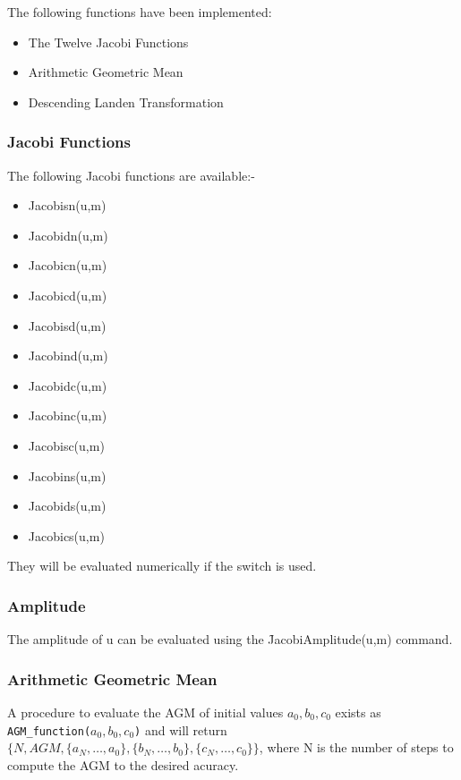 The following functions have been implemented:

\begin{itemize}
\item The Twelve Jacobi Functions
\item Arithmetic Geometric Mean
\item Descending Landen Transformation
\end{itemize}

\subsubsection{Jacobi Functions}

The following Jacobi functions are available:-

\begin{itemize}
\item Jacobisn(u,m)
\item Jacobidn(u,m)
\item Jacobicn(u,m)
\item Jacobicd(u,m)
\item Jacobisd(u,m)
\item Jacobind(u,m)
\item Jacobidc(u,m)
\item Jacobinc(u,m)
\item Jacobisc(u,m)
\item Jacobins(u,m)
\item Jacobids(u,m)
\item Jacobics(u,m)
\end{itemize}

They will be evaluated numerically if the  switch is used.

\subsubsection{Amplitude}

The amplitude of u can be evaluated using the 
\f{JacobiAmplitude(u,m)} command.

\subsubsection{Arithmetic Geometric Mean}

A procedure to evaluate the AGM of initial values \(a_0,b_0,c_0\) 
exists as \\
\texttt{AGM\_function(\(a_0,b_0,c_0\))} and will return \\
$\{ N, AGM, \{ a_N, \ldots ,a_0\}, \{ b_N, \ldots ,b_0\}, 
\{c_N, \ldots ,c_0\}\}$, 
where N is the number of steps to compute the AGM to the 
desired acuracy. \\

